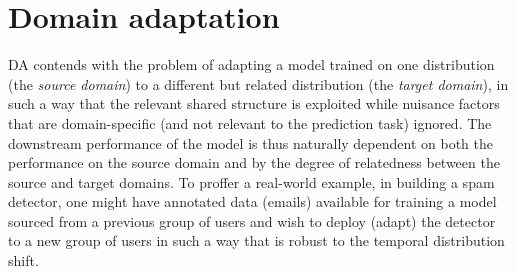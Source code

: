 \section{Domain adaptation}\label{sec:domain-adaptation}
\Ac{DA} contends with the problem of adapting a model trained on one distribution (the \emph{source
domain}) to a different but related distribution (the \emph{target domain}), in such a way that the
relevant shared structure is exploited while nuisance factors that are domain-specific (and not
relevant to the prediction task) ignored.
%
The downstream performance of the model is thus naturally dependent on both the performance on the
source domain and by the degree of relatedness between the source and target domains.
%
To proffer a real-world example, in building a spam detector, one might have annotated data
(emails) available for training a model sourced from a previous group of users and wish to deploy
(adapt) the detector to a new group of users in such a way that is robust to the temporal
distribution shift.

